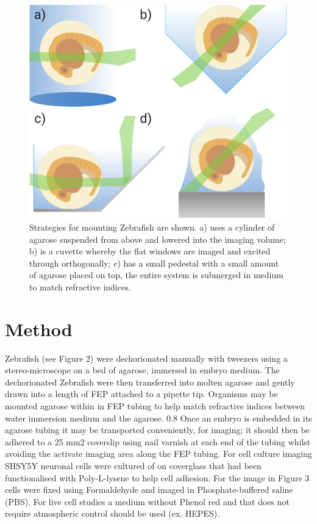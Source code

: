 \begin{figure}
    \centering
    \includegraphics{./mounting_straegies_fish_cartoon}
    \caption{Strategies for mounting Zebrafish are shown.
    a) uses a cylinder of agarose suspended from above and lowered into the imaging volume;
    b) is a cuvette whereby the flat windows are imaged and excited through orthogonally;
    c) has a small pedestal with a small amount of agarose placed on top, the entire system is submerged in medium to match refractive indices.}
    \label{fig:mounting_straegies_fish}
\end{figure}

\section{Method}
Zebrafish (see Figure 2) were dechorionated manually with tweezers using a stereo-microscope on a bed of agarose, immersed in embryo medium.
The dechorionated Zebrafish were then transferred into molten agarose and gently drawn into a length of FEP attached to a pipette tip.
Organisms may be mounted agarose within in FEP tubing to help match refractive indices between water immersion medium and the agarose.
0.8%
Once an embryo is embedded in its agarose tubing it may be transported conveniently, for imaging; it should then be adhered to a 25 mm2 coverslip using nail varnish at each end of the tubing whilst avoiding the activate imaging area along the FEP tubing.
For cell culture imaging SHSY5Y neuronal cells were cultured of on coverglass that had been functionalised with Poly-L-lysene to help cell adhesion.
For the image in Figure 3 cells were fixed using Formaldehyde and imaged in Phosphate-buffered saline (PBS).
For live cell studies a medium without Phenol red and that does not require atmospheric control should be used (ex.
HEPES).

